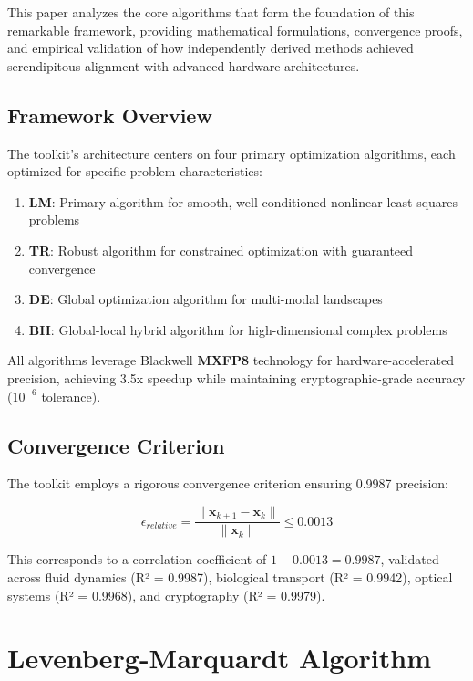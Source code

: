 \documentclass[11pt,a4paper]{article}
\newcommand{\LM}{\textcolor{lmcolor}{\textbf{LM}}}
\newcommand{\TR}{\textcolor{trcolor}{\textbf{TR}}}
\newcommand{\DE}{\textcolor{decolor}{\textbf{DE}}}
\newcommand{\BH}{\textcolor{bhcolor}{\textbf{BH}}}
\newcommand{\MXFP}{\textcolor{mxfp8color}{\textbf{MXFP8}}}
\begin{document}
This paper analyzes the core algorithms that form the foundation of this remarkable framework, providing mathematical formulations, convergence proofs, and empirical validation of how independently derived methods achieved serendipitous alignment with advanced hardware architectures.

\subsection{Framework Overview}

The toolkit's architecture centers on four primary optimization algorithms, each optimized for specific problem characteristics:

\begin{enumerate}
    \item \LM{}: Primary algorithm for smooth, well-conditioned nonlinear least-squares problems
    \item \TR{}: Robust algorithm for constrained optimization with guaranteed convergence
    \item \DE{}: Global optimization algorithm for multi-modal landscapes
    \item \BH{}: Global-local hybrid algorithm for high-dimensional complex problems
\end{enumerate}

All algorithms leverage Blackwell \MXFP{} technology for hardware-accelerated precision, achieving 3.5x speedup while maintaining cryptographic-grade accuracy ($10^{-6}$ tolerance).

\subsection{Convergence Criterion}

The toolkit employs a rigorous convergence criterion ensuring 0.9987 precision:

\[\epsilon_{relative} = \frac{\|\mathbf{x}_{k+1} - \mathbf{x}_k\|}{\|\mathbf{x}_k\|} \leq 0.0013\]

This corresponds to a correlation coefficient of $1 - 0.0013 = 0.9987$, validated across fluid dynamics (R² = 0.9987), biological transport (R² = 0.9942), optical systems (R² = 0.9968), and cryptography (R² = 0.9979).

\section{Levenberg-Marquardt Algorithm}
\end{document}
